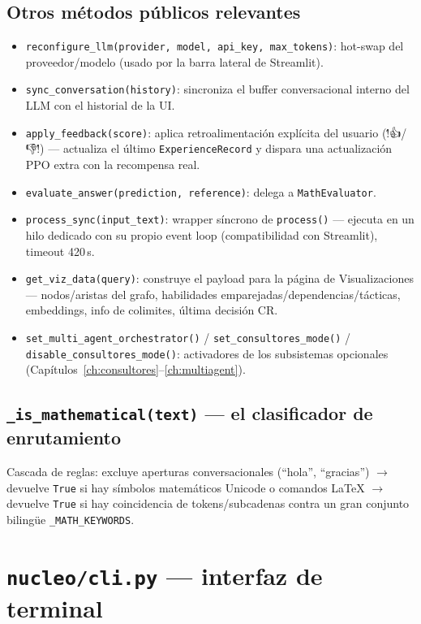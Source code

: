 \documentclass[11pt,a4paper]{report}
\newcommand{\code}[1]{\texttt{#1}}
\begin{document}
\subsection{Otros m\'etodos p\'ublicos relevantes}
\begin{itemize}
  \item \code{reconfigure_llm(provider, model, api_key, max_tokens)}: hot-swap del proveedor/modelo (usado por la barra lateral de Streamlit).
  \item \code{sync_conversation(history)}: sincroniza el buffer conversacional interno del LLM con el historial de la UI.
  \item \code{apply_feedback(score)}: aplica retroalimentaci\'on expl\'icita del usuario (\'!👍/👎\'!) --- actualiza el \'ultimo \code{ExperienceRecord} y dispara una actualizaci\'on PPO extra con la recompensa real.
  \item \code{evaluate_answer(prediction, reference)}: delega a \code{MathEvaluator}.
  \item \code{process_sync(input_text)}: wrapper s\'incrono de \code{process()} --- ejecuta en un hilo dedicado con su propio event loop (compatibilidad con Streamlit), timeout 420\,s.
  \item \code{get_viz_data(query)}: construye el payload para la p\'agina de Visualizaciones --- nodos/aristas del grafo, habilidades emparejadas/dependencias/t\'acticas, embeddings, info de colimites, \'ultima decisi\'on CR.
  \item \code{set_multi_agent_orchestrator()} / \code{set_consultores_mode()} / \code{disable_consultores_mode()}: activadores de los subsistemas opcionales (Cap\'itulos~\ref{ch:consultores}--\ref{ch:multiagent}).
\end{itemize}

\subsection{\code{\_is_mathematical(text)} --- el clasificador de enrutamiento}
Cascada de reglas: excluye aperturas conversacionales (``hola'', ``gracias'') $\to$ devuelve \code{True} si hay s\'imbolos matem\'aticos Unicode o comandos LaTeX $\to$ devuelve \code{True} si hay coincidencia de tokens/subcadenas contra un gran conjunto biling\"ue \code{\_MATH_KEYWORDS}.

\section{\code{nucleo/cli.py} --- interfaz de terminal}
\end{document}
